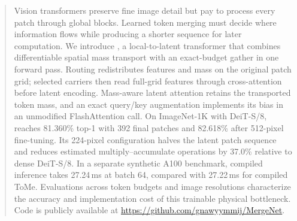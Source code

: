 \begin{abstract}
Vision transformers preserve fine image detail but pay to process every patch
through global blocks. Learned token merging must decide where information
flows while producing a shorter sequence for later computation. We introduce
\mn{}, a local-to-latent transformer that combines differentiable spatial
mass transport with an exact-budget gather in one forward pass. Routing
redistributes features and mass on the original patch grid; selected carriers
then read full-grid features through cross-attention before latent encoding.
Mass-aware latent attention retains the transported token mass, and an exact
query/key augmentation implements its bias in an unmodified FlashAttention
call. On ImageNet-1K with DeiT-S/8, \mn{} reaches 81.360\% top-1 with 392
final patches and 82.618\% after 512-pixel fine-tuning. Its 224-pixel
configuration halves the latent patch sequence and reduces estimated
multiply--accumulate operations by 37.0\% relative to dense DeiT-S/8.
In a separate synthetic A100 benchmark, compiled inference takes 27.24\,ms
at batch 64, compared with 27.22\,ms for compiled ToMe. Evaluations across
token budgets and image resolutions characterize the accuracy and
implementation cost of this trainable physical bottleneck.
Code is publicly available at \url{https://github.com/gnawyymmij/MergeNet}.
\end{abstract}
